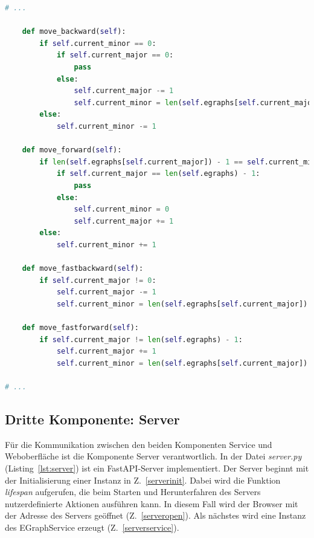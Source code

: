\begin{lstlisting}[language=Python, caption=Methoden für das Debugging aus der Datei \textit{EGraphService.py}]
# ... 

    def move_backward(self):
        if self.current_minor == 0:
            if self.current_major == 0:
                pass
            else:
                self.current_major -= 1
                self.current_minor = len(self.egraphs[self.current_major]) - 1
        else:
            self.current_minor -= 1

    def move_forward(self):
        if len(self.egraphs[self.current_major]) - 1 == self.current_minor:
            if self.current_major == len(self.egraphs) - 1:
                pass
            else:
                self.current_minor = 0
                self.current_major += 1
        else:
            self.current_minor += 1

    def move_fastbackward(self):
        if self.current_major != 0:
            self.current_major -= 1
            self.current_minor = len(self.egraphs[self.current_major]) - 1

    def move_fastforward(self):
        if self.current_major != len(self.egraphs) - 1:
            self.current_major += 1
            self.current_minor = len(self.egraphs[self.current_major]) - 1

# ... 
\end{lstlisting} 



\subsection{Dritte Komponente: Server}


Für die Kommunikation zwischen den beiden Komponenten Service und Weboberfläche ist die Komponente Server verantwortlich.
In der Datei \textit{server.py} (Listing~\ref{lst:server}) ist ein FastAPI-Server implementiert.
Der Server beginnt mit der Initialisierung einer Instanz in Z.~\ref{serverinit}. Dabei wird die Funktion \textit{lifespan} aufgerufen, die beim Starten und Herunterfahren des
Servers nutzerdefinierte Aktionen ausführen kann. In diesem Fall wird der Browser mit der Adresse des Servers geöffnet (Z.~\ref{serveropen}).
Als nächstes wird eine Instanz des EGraphService erzeugt (Z.~\ref{serverservice}).

